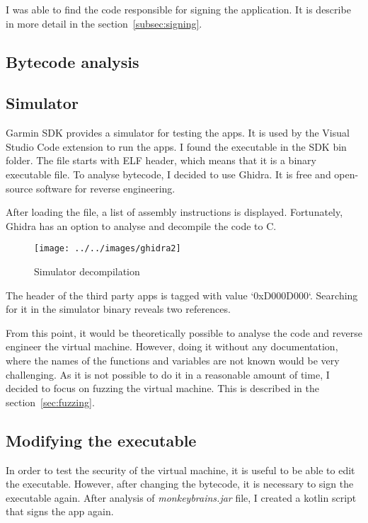 I was able to find the code responsible for signing the application.
It is describe in more detail in the section~\ref{subsec:signing}.

\subsection{Bytecode analysis}

\subsection{Simulator}
Garmin SDK provides a simulator for testing the apps.
It is used by the Visual Studio Code extension to run the apps.
I found the executable in the SDK bin folder.
The file starts with ELF header, which means that it is a binary executable file.
To analyse bytecode, I decided to use Ghidra\cite{ghidra}.
It is free and open-source software for reverse engineering.

After loading the file, a list of assembly instructions is displayed.
Fortunately, Ghidra has an option to analyse and decompile the code to C\@.

\begin{figure}[h]
    \centering
    \texttt{[image: ../../images/ghidra2]}
    \caption{Simulator decompilation}
    \label{fig:concept}
\end{figure}

The header of the third party apps is tagged with value `0xD000D000`\cite{broken-vm}.
Searching for it in the simulator binary reveals two references.

From this point, it would be theoretically possible to analyse the code and reverse engineer the virtual machine.
However, doing it without any documentation, where the names of the functions and variables are not known would be very challenging.
As it is not possible to do it in a reasonable amount of time, I decided to focus on fuzzing the virtual machine.
This is described in the section~\ref{sec:fuzzing}.

\subsection{Modifying the executable}
In order to test the security of the virtual machine, it is useful to be able to edit the executable.
However, after changing the bytecode, it is necessary to sign the executable again.
After analysis of \textit{monkeybrains.jar} file, I created a kotlin script that signs the app again.
